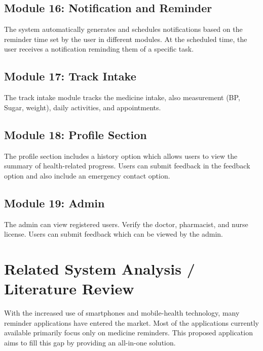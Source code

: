 \documentclass[12pt, a4paper, oneside]{report}
\begin{document}
\subsection{Module 16: Notification and Reminder}
The system automatically generates and schedules notifications based on the reminder time set by the user in different modules. At the scheduled time, the user receives a notification reminding them of a specific task.

\subsection{Module 17: Track Intake}
The track intake module tracks the medicine intake, also measurement (BP, Sugar, weight), daily activities, and appointments.

\subsection{Module 18: Profile Section}
The profile section includes a history option which allows users to view the summary of health-related progress. Users can submit feedback in the feedback option and also include an emergency contact option.

\subsection{Module 19: Admin}
The admin can view registered users. Verify the doctor, pharmacist, and nurse license. Users can submit feedback which can be viewed by the admin.

\section{Related System Analysis / Literature Review}
\label{sec:literature-review}

With the increased use of smartphones and mobile-health technology, many reminder applications have entered the market. Most of the applications currently available primarily focus only on medicine reminders. This proposed application aims to fill this gap by providing an all-in-one solution.
\end{document}
